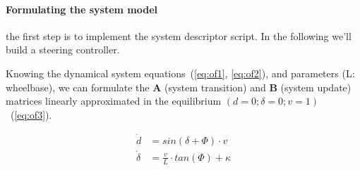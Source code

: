 \paragraph{Formulating the system model}

the first step is to implement the system descriptor script. In the following we'll build a steering controller.

Knowing the dynamical system equations~(\ref{eq:of1}, \ref{eq:of2}), and parameters (L: wheelbase), we can formulate the \textbf{A} (system transition) and \textbf{B} (system update) matrices linearly approximated in the equilibrium $(d = 0; \delta = 0; v = 1)$ ~(\ref{eq:of3}).

\begin{align} 
    \dot{d} &= sin(\delta + \Phi) \cdot v  \label{eq:of1} \\ 
    \dot{\delta} &= \frac{v}{L} \cdot tan(\Phi) + \kappa \label{eq:of2}
\end{align}


